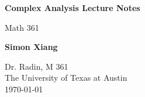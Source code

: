 \documentclass{article}
\begin{document}
\begin{titlepage}
    \begin{center}
        \vspace*{1cm}
 
        \Huge
        \textbf{Complex Analysis Lecture Notes}
 
        \vspace{0.5cm}
        \LARGE
        Math 361

        \vspace{1.5cm}
 
        \textbf{Simon Xiang}
 
        \vfill
  
        \vspace{0.8cm}
 
        \Large
    	Dr. Radin, M 361\\
        The University of Texas at Austin\\
        \today
 
    \end{center}
\end{titlepage}
    
\end{document}
